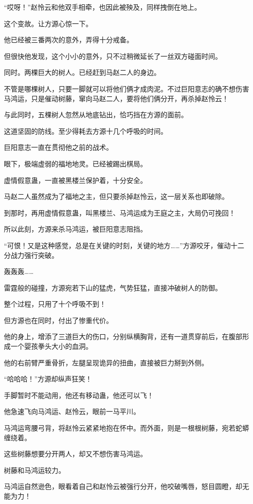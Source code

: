 \begin{this_body}
“哎呀！”赵怜云和他双手相牵，也因此被殃及，同样拽倒在地上。

这个变故。让方源心惊一下。

他已经被三番两次的意外，弄得十分戒备。

但很快他发现，这个小小的意外，只不过稍微延长了一丝双方碰面时间。

同时。两棵巨大的树人。已经赶到马赵二人的身边。

不管是哪棵树人，只要一脚就可以将他们俩才成肉泥。不过巨阳意志的确不想伤害马鸿运，只是催动树藤，窜向马赵二人，要将他们俩分开，再杀掉赵怜云！

与此同时，五棵树人忽然从地底钻出，恰巧挡在方源的面前。

这道坚固的防线。至少得耗去方源十几个呼吸的时间。

巨阳意志一直在贯彻他之前的战术。

眼下，极端虚弱的福地地灵。已经被踢出棋局。

虚情假意蛊，一直被黑楼兰保护着，十分安全。

马赵二人虽然成为了福地之主，但只要杀掉赵怜云，这一层关系也即破除。

到那时，再用虚情假意蛊，叫黑楼兰、马鸿运成为王庭之主，大局仍可挽回！

所以此刻，方源来杀马鸿运，被巨阳意志阻挡。

“可恨！又是这种感觉，总是在关键的时刻，关键的地方……”方源咬牙，催动十二分战力强行突破。

轰轰轰……

雷霆般的碰撞，方源宛若下山的猛虎，气势狂猛，直接冲破树人的防御。

整个过程，只用了十个呼吸不到！

但方源也在同时，付出了惨重代价。

他的身上，增添了三道巨大的伤口，分别纵横胸背，还有一道贯穿前后，在腹部形成一个婴孩拳头大小的血洞。

他的右前臂严重骨折，左腿呈现诡异的扭曲，直接被巨力掰到外侧。

“哈哈哈！”方源却纵声狂笑！

手脚暂时不能动用，他还有移动蛊，他还可以飞！

他急速飞向马鸿运、赵怜云，眼前一马平川。

马鸿运弯腰弓背，将赵怜云紧紧地抱在怀中。而外面，则是一根根树藤，宛若蛇蟒缠绕着。

这些树藤想要分开两人，却又不想伤害马鸿运。

树藤和马鸿运较力。

马鸿运自然逊色，眼看着自己和赵怜云被强行分开，他咬破嘴唇，怒目圆瞪，却无能为力！


\end{this_body}
